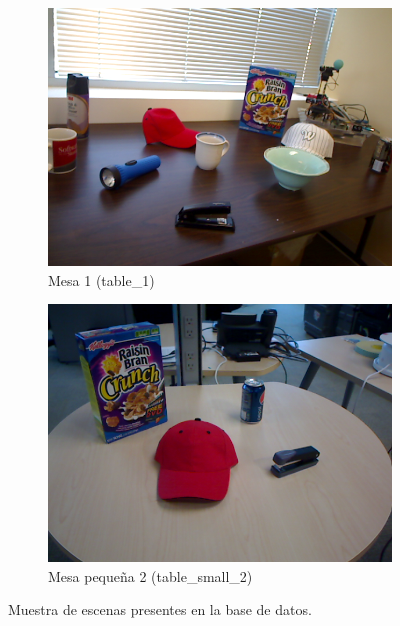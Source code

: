 \begin{figure}
    \quad
    \begin{subfigure}[b]{0.4\textwidth}
        \includegraphics[width=\textwidth]{img/base_rgbd/table_1.png}
        \caption{Mesa 1 (table\_1)}
		\label{fig:table_1}
    \end{subfigure}
	\quad
    \begin{subfigure}[b]{0.4\textwidth}
        \includegraphics[width=\textwidth]{img/base_rgbd/table_small_2.png}
        \caption{Mesa pequeña 2 (table\_small\_2)}
		\label{fig:table_small_2}
    \end{subfigure}

    \caption{Muestra de escenas presentes en la base de datos.}
    \label{fig:ejemplo_escenas_base}
\end{figure}

